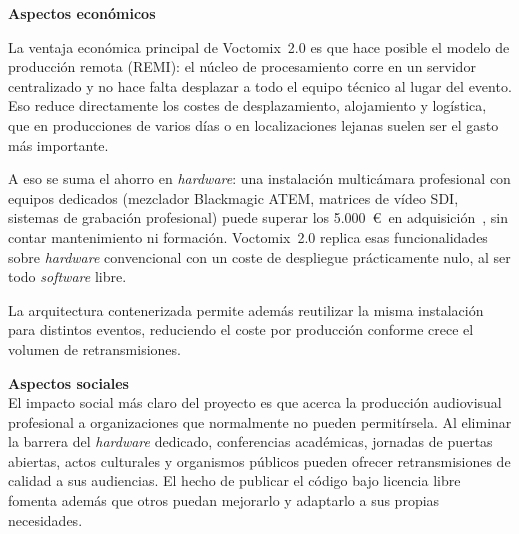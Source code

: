 \vspace{0.15cm}
\noindent\textbf{Aspectos económicos}\\
\normalsize{La ventaja económica principal de Voctomix~2.0 es que hace posible el modelo de
producción remota (\ac{REMI}): el núcleo de procesamiento corre en un servidor centralizado y no hace
falta desplazar a todo el equipo técnico al lugar del evento. Eso reduce directamente los costes
de desplazamiento, alojamiento y logística, que en producciones de varios días o en localizaciones
lejanas suelen ser el gasto más importante.

A eso se suma el ahorro en \textit{hardware}: una instalación multicámara profesional con equipos dedicados
(mezclador Blackmagic ATEM, matrices de vídeo SDI, sistemas de grabación profesional) puede
superar los 5.000~\euro\ en adquisición~\cite{blackmagic_atem}, sin contar mantenimiento ni
formación. Voctomix~2.0 replica esas funcionalidades sobre \textit{hardware} convencional con un coste de
despliegue prácticamente nulo, al ser todo \textit{software} libre.

La arquitectura contenerizada permite además reutilizar la misma instalación para distintos
eventos, reduciendo el coste por producción conforme crece el volumen de retransmisiones.}

\vspace{0.15cm}
\noindent\textbf{Aspectos sociales}\\
\normalsize{El impacto social más claro del proyecto es que acerca la producción audiovisual
profesional a organizaciones que normalmente no pueden permitírsela. Al eliminar la barrera del
\textit{hardware} dedicado, conferencias académicas, jornadas de puertas abiertas, actos culturales y
organismos públicos pueden ofrecer retransmisiones de calidad a sus audiencias. El hecho de
publicar el código bajo licencia libre fomenta además que otros puedan mejorarlo y adaptarlo a
sus propias necesidades.}

